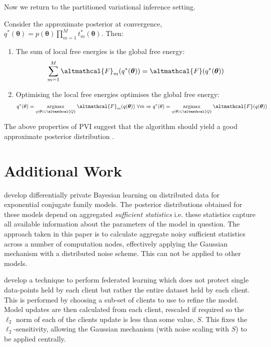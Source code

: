 Now we return to the partitioned variational inference setting.
\begin{theorem}
	Consider the approximate posterior at convergence, $q^*(\bm{\theta}) = p(\bm{\theta}) \prod_{m=1}^M t_m^{*}(\bm{\theta})$. Then:
	\begin{enumerate}
		\item The sum of local free energies is the global free energy:
		\begin{align}
		\sum_{m=1}^M \altmathcal{F}_m(q^*(\bm{\theta})) = \altmathcal{F}(q^*(\bm{\theta}))
		\end{align}
		\item Optimising the local free energies optimises the global free energy:
		\begin{align}
		q^*(\theta) = \mathop{\mathrm{argmax}}_{q(\bm{\theta}) \in \altmathcal{Q}} \altmathcal{F}_m(q(\bm{\theta}))\ \forall m \Rightarrow q^*(\theta) = \mathop{\mathrm{argmax}}_{q(\bm{\theta}) \in \altmathcal{Q}} \altmathcal{F}(q(\bm{\theta}))
		\end{align}
	\end{enumerate}
\end{theorem}

The above properties of PVI suggest that the algorithm should yield a good approximate posterior distribution \citep{PVI}.

\section{Additional Work}
\cite{heikkila2017differentially} develop differentially private Bayesian learning on distributed data for exponential conjugate family models. The posterior distributions obtained for these models depend on aggregated \emph{sufficient statistics} i.e. these statistics capture all available information about the parameters of the model in question. The approach taken in this paper is to calculate aggregate noisy sufficient statistics across a number of computation nodes, effectively applying the Gaussian mechanism with a distributed noise scheme. This can not be applied to other models.

\cite{geyer2017differentially} develop a technique to perform federated learning which does not protect single data-points held by each client but rather the entire dataset held by each client. This is performed by choosing a sub-set of clients to use to refine the model. Model updates are then calculated from each client, rescaled if required so the $\ell_2$ norm of each of the clients update is less than some value, $S$. This fixes the $\ell_2$-sensitivity, allowing the Gaussian mechanism (with noise scaling with $S$) to be applied centrally.